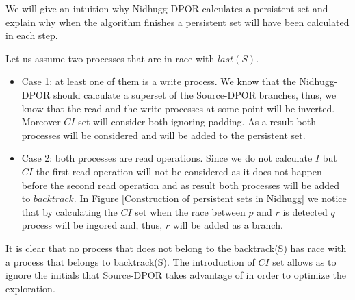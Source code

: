 We will give an intuition why Nidhugg-DPOR calculates a persistent set and explain why when the algorithm finishes a persistent set will have been calculated in each step.

Let us assume two processes that are in race with $last(S)$.
\begin{itemize}

\item Case 1: at least one of them is a write process.
We know that the Nidhugg-DPOR should calculate a superset of the Source-DPOR branches, thus, we know that the read and the write processes at some point
will be inverted. Moreover $CI$ set will consider both ignoring padding. As a result both processes will be considered and will be added to the persistent set.


\item Case 2: both processes are read operations.
Since we do not calculate $I$ but $CI$ the first read operation will not be considered as it does not happen before the second read operation and as result
both processes will be added to $backtrack$. In Figure \ref{Construction of persistent sets in Nidhugg} we notice that by calculating the $CI$ set when the race
between $p$ and $r$ is detected $q$ process will be ingored and, thus, $r$ will be added as a branch.


\end{itemize}

It is clear that no process that does not belong to the backtrack(S) has race with a process that belongs to backtrack(S). The introduction of $CI$ set allows
as to ignore the initials that Source-DPOR takes advantage of in order to optimize the exploration.
